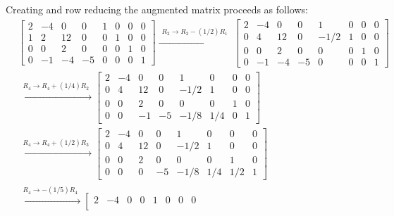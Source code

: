 \documentclass{article}
\begin{document}
\begin{itemize}
Creating and row reducing the augmented matrix proceeds as follows:
\begin{align*}
& \left[\begin{array}{cccc|cccc}
2 & -4 & 0 & 0 & 1 & 0 & 0 & 0 \\
1 & 2 & 12 & 0 & 0 & 1 & 0 & 0 \\
0 & 0 & 2 & 0 & 0 & 0 & 1 & 0 \\
0 & -1 & -4 & -5 & 0 & 0 & 0 & 1
\end{array}\right]
\xrightarrow{\begin{array}{c} R_2 \rightarrow R_2 - (1/2)R_1 \end{array}}
\left[\begin{array}{cccc|cccc}
2 & -4 &  0 &  0 &    1 & 0 & 0 & 0 \\
0 &  4 & 12 &  0 & -1/2 & 1 & 0 & 0 \\
0 &  0 &  2 &  0 &    0 & 0 & 1 & 0 \\
0 & -1 & -4 & -5 &    0 & 0 & 0 & 1
\end{array}\right] \\
& \xrightarrow{\begin{array}{c} R_4 \rightarrow R_4 + (1/4)R_2 \end{array}}
\left[\begin{array}{cccc|cccc}
2 & -4 &  0 &  0 &    1 &   0 & 0 & 0 \\
0 &  4 & 12 &  0 & -1/2 & 1 & 0 & 0 \\
0 &  0 &  2 &  0 &    0 &   0 & 1 & 0 \\
0 & 0 & -1 & -5 & -1/8 & 1/4 & 0 & 1
\end{array}\right] \\
& \xrightarrow{\begin{array}{c} R_4 \rightarrow R_4 + (1/2)R_3 \end{array}}
\left[\begin{array}{cccc|cccc}
2 & -4 &  0 &  0 &    1 &   0 & 0 & 0 \\
0 &  4 & 12 &  0 & -1/2 & 1 & 0 & 0 \\
0 &  0 &  2 &  0 &    0 &   0 & 1 & 0 \\
0 & 0 &  0 & -5 & -1/8 & 1/4 & 1/2 & 1
\end{array}\right] \\ 
& \xrightarrow{\begin{array}{c} R_4 \rightarrow -(1/5)R_4 \end{array}}
\left[\begin{array}{cccc|cccc}
2 & -4 &  0 &  0 &    1 &       0 &        0 & 0 \\

\end{array}
\end{align*}
\end{itemize}
\end{document}
